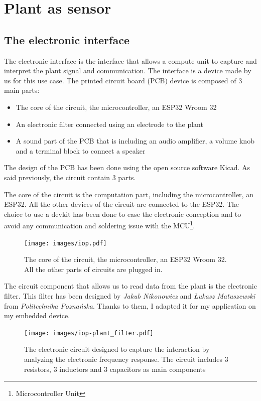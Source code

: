 \section{Plant as sensor}

\subsection{The electronic interface}

The electronic interface is the interface that allows a compute unit to capture and interpret the plant signal and
communication. The interface is a device made by us for this use case. The printed circuit board (PCB)
device is composed of 3 main parts:
\begin{itemize}
    \item The core of the circuit, the microcontroller, an ESP32 Wroom 32
    \item An electronic filter connected using an electrode to the plant
    \item A sound part of the PCB that is including an audio amplifier, a volume knob and a terminal block to connect a speaker
\end{itemize}

The design of the PCB has been done using the open source software Kicad.
As said previously, the circuit contain 3 parts.

The core of the circuit is the computation part, including the microcontroller, an ESP32. All the other
devices of the circuit are connected to the ESP32. The choice to use a devkit has been done 
to ease the electronic conception and to avoid any communication and soldering issue with the MCU\footnote[1]{Microcontroller Unit}.

\begin{figure}[h!]
    \centering
    \texttt{[image: images/iop.pdf]}
    \caption{The core of the circuit, the microcontroller, an ESP32 Wroom 32. All the other parts of
    circuits are plugged in.} 
    \vspace{0.1cm}
    \label{fig:iop_schematic_main}
\end{figure}

The circuit component that allows us to read data from the plant is the electronic filter.
This filter has been designed by \textit{Jakub Nikonowicz} and \textit{Łukasz Matuszewski} 
from \textit{Politechnika Poznańska}.
Thanks to them, I adapted it for my application on my embedded device. 

\begin{figure}[h!]
    \centering
    \texttt{[image: images/iop-plant\_filter.pdf]}
    \caption{The electronic circuit designed to capture the interaction by analyzing the electronic
    frequency response. The circuit includes 3 resistors, 3 inductors and 3 capacitors as main components} 
    \vspace{0.1cm}
    \label{fig:iop_schematic_filter}
\end{figure}

